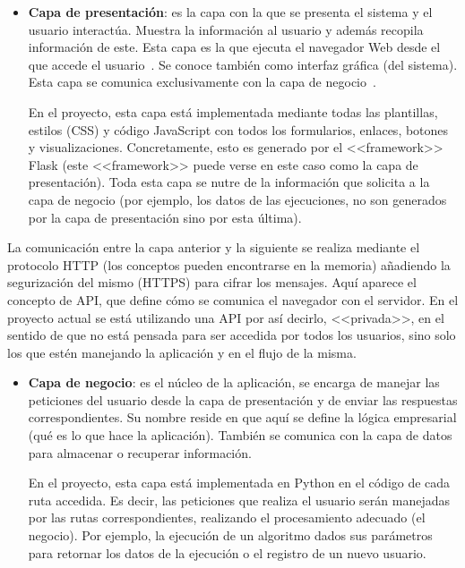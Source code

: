 

\begin{itemize}
    \item \textbf{Capa de presentación}: es la capa con la que se presenta el
    sistema y el usuario interactúa. Muestra la información al usuario y además
    recopila información de este. Esta capa es la que ejecuta el navegador Web
    desde el que accede el usuario~\cite{arq3capas:ibm}. Se conoce también como
    interfaz gráfica (del sistema). Esta capa se comunica exclusivamente con la
    capa de negocio~\cite{eswiki:149121324}.

    En el proyecto, esta capa está implementada mediante todas las plantillas,
    estilos (CSS) y código JavaScript con todos los formularios, enlaces,
    botones y visualizaciones. Concretamente, esto es generado por el
    <<framework>> Flask (este <<framework>> puede verse en este caso como la
    capa de presentación). Toda esta capa se nutre de la información que
    solicita a la capa de negocio (por ejemplo, los datos de las ejecuciones, no
    son generados por la capa de presentación sino por esta última). 
\end{itemize}

La comunicación entre la capa anterior y la siguiente se realiza mediante el
protocolo HTTP (los conceptos pueden encontrarse en la memoria) añadiendo la
segurización del mismo (HTTPS) para cifrar los mensajes. Aquí aparece el
concepto de API, que define cómo se comunica el navegador con el servidor. En el
proyecto actual se está utilizando una API por así decirlo, <<privada>>, en el
sentido de que no está pensada para ser accedida por todos los usuarios, sino
solo los que estén manejando la aplicación y en el flujo de la misma. 

\begin{itemize}
    \item \textbf{Capa de negocio}: es el núcleo de la aplicación, se encarga de
    manejar las peticiones del usuario desde la capa de presentación y de enviar
    las respuestas correspondientes. Su nombre reside en que aquí se define la
    lógica empresarial (qué es lo que hace la aplicación). También se comunica
    con la capa de datos para almacenar o recuperar información.

    En el proyecto, esta capa está implementada en Python en el código de cada
    ruta accedida. Es decir, las peticiones que realiza el usuario serán
    manejadas por las rutas correspondientes, realizando el procesamiento
    adecuado (el negocio). Por ejemplo, la ejecución de un algoritmo dados sus
    parámetros para retornar los datos de la ejecución o el registro de un nuevo
    usuario.
\end{itemize}

